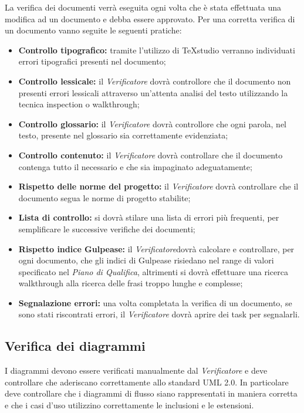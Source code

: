 La verifica dei documenti verrà eseguita ogni volta che è stata effettuata una modifica ad un documento e debba essere approvato.
Per una corretta verifica di un documento vanno seguite le seguenti pratiche:

\begin{itemize}
	\item \textbf{Controllo tipografico: }tramite l'utilizzo di TeXstudio verranno individuati errori tipografici presenti nel documento;
	\item \textbf{Controllo lessicale: }il \textit{Verificatore} dovrà controllore che il documento non presenti errori lessicali attraverso un'attenta analisi del testo utilizzando la tecnica inspection o walkthrough;
	\item \textbf{Controllo glossario: }il \textit{Verificatore} dovrà controllore che ogni parola, nel testo, presente nel glossario sia correttamente evidenziata;
	\item \textbf{Controllo contenuto: }il \textit{Verificatore} dovrà controllare che il documento contenga tutto il necessario e che sia impaginato adeguatamente;
	\item \textbf{Rispetto delle norme del progetto: }il \textit{Verificatore} dovrà controllare che il documento segua le norme di progetto stabilite;
	\item \textbf{Lista di controllo: }si dovrà stilare una lista di errori più frequenti, per semplificare le successive verifiche dei documenti;
	\item \textbf{Rispetto indice Gulpease: }il \textit{Verificatore}dovrà calcolare e controllare, per ogni documento, che gli indici di Gulpease risiedano nel range di valori specificato nel \textit{Piano di Qualifica}, altrimenti si dovrà effettuare una ricerca walkthrough alla ricerca delle frasi troppo lunghe e complesse;
	\item \textbf{Segnalazione errori: }una volta completata la verifica di un documento, se sono stati riscontrati errori, il \textit{Verificatore} dovrà aprire dei task per segnalarli.
\end{itemize}

\subsection{Verifica dei diagrammi}

I diagrammi devono essere verificati manualmente dal \textit{Verificatore} e deve controllare che aderiscano correttamente allo standard UML 2.0.
In particolare deve controllare che i diagrammi di flusso siano rappresentati in maniera corretta e che i casi d'uso utilizzino correttamente le inclusioni e le estensioni.